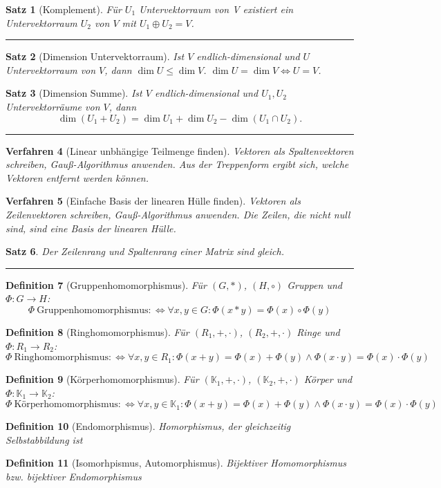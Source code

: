 \documentclass[a4paper]{article}
\newcounter{Sec}
\theoremstyle{marginbreak}
\newtheorem{definition}{Definition}[Sec]
\newtheorem{satz}[definition]{Satz}
\newtheorem{verfahren}[definition]{Verfahren}
\newcommand{\sep}{%
	\rule{\textwidth}{0.3pt}%
	\stepcounter{Sec}%
	}
\begin{document}
	\begin{satz}[Komplement]
		Für $U_1$ Untervektorraum von V existiert ein Untervektorraum $U_2$ von $V$ mit $U_1 \oplus U_2 = V$.
	\end{satz}
	\sep
	\begin{satz}[Dimension Untervektorraum]
		Ist $V$ endlich-dimensional und $U$ Untervektorraum von $V$, dann $\dim U\leq\dim V$.
		$\dim U=\dim V \iff U = V$.
	\end{satz}
	\begin{satz}[Dimension Summe]
		Ist $V$ endlich-dimensional und $U_1, U_2$ Untervektorräume von $V$, dann
		\[\dim(U_1 + U_2) = \dim U_1 + \dim U_2 - \dim(U_1 \cap U_2).\]
	\end{satz}
	\sep
	\begin{verfahren}[Linear unbhängige Teilmenge finden]
		Vektoren als Spaltenvektoren schreiben, Gauß-Algorithmus anwenden.
		Aus der Treppenform ergibt sich, welche Vektoren entfernt werden können.
	\end{verfahren}
	\begin{verfahren}[Einfache Basis der linearen Hülle finden]
		Vektoren als Zeilenvektoren schreiben, Gauß-Algorithmus anwenden.
		Die Zeilen, die nicht null sind, sind eine Basis der linearen Hülle.
	\end{verfahren}
	\begin{satz}
		Der Zeilenrang und Spaltenrang einer Matrix sind gleich.
	\end{satz}
	\sep
	\begin{definition}[Gruppenhomomorphismus]
		Für $(G, *)$, $(H, \circ)$ Gruppen und $\Phi\colon G \to H$:
		\[\Phi~\text{Gruppenhomomorphismus} :\Longleftrightarrow \forall x, y \in G: \Phi(x * y) = \Phi(x)\circ\Phi(y)\]
	\end{definition}
	\begin{definition}[Ringhomomorphismus]
		Für $(R_1, +, \cdot)$, $(R_2, +, \cdot)$ Ringe und $\Phi\colon R_1\to R_2$:
		\[\Phi~\text{Ringhomomorphismus} :\Longleftrightarrow \forall x, y \in R_1: \Phi(x + y) = \Phi(x) + \Phi(y) \wedge
		\Phi(x \cdot y) = \Phi(x) \cdot \Phi(y)\]
	\end{definition}
	\begin{definition}[Körperhomomorphismus]
		Für $(\mathbb{K}_1, +, \cdot)$, $(\mathbb{K}_2, +, \cdot)$ Körper und $\Phi\colon\mathbb{K}_1\to \mathbb{K}_2$:
		\[\Phi~\text{Körperhomomorphismus} :\Longleftrightarrow \forall x, y \in \mathbb{K}_1: \Phi(x + y) = \Phi(x) + \Phi(y) \wedge
		\Phi(x \cdot y) = \Phi(x) \cdot \Phi(y)\]
	\end{definition}
	\begin{definition}[Endomorphismus]
		Homorphismus, der gleichzeitig Selbstabbildung ist
	\end{definition}
	\begin{definition}[Isomorhpismus, Automorphismus]
		Bijektiver Homomorphismus bzw. bijektiver Endomorphismus
	\end{definition}
\end{document}
